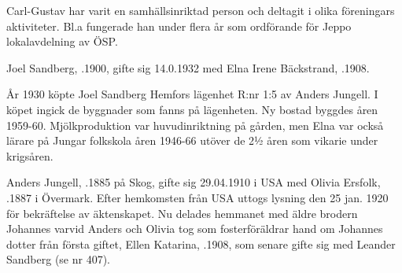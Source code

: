 Carl-Gustav har varit en samhällsinriktad person och deltagit i olika föreningars aktiviteter. Bl.a fungerade han under flera år som
ordförande för Jeppo lokalavdelning av ÖSP.
\begin{jhchildren}
  \item {}
  \item {}
  \item {}
  \item {}
\end{jhchildren}





Joel Sandberg, .1900, gifte sig 14.0.1932 med Elna Irene Bäckstrand, .1908.

År 1930 köpte Joel Sandberg Hemfors lägenhet R:nr 1:5 av Anders Jungell. I köpet ingick de byggnader som fanns på lägenheten. Ny bostad byggdes åren 1959-60. Mjölkproduktion var huvudinriktning på gården, men Elna var också lärare på Jungar folkskola åren 1946-66 utöver de 2½ åren som vikarie under krigsåren.
\begin{jhchildren}
  \item {}
  \item {}
  \item {}
  \item {}
\end{jhchildren}


Anders Jungell, .1885 på Skog, gifte sig  29.04.1910 i USA med Olivia Ersfolk, .1887 i Övermark. Efter hemkomsten från USA uttogs lysning den 25 jan. 1920 för bekräftelse av äktenskapet. Nu delades hemmanet med äldre brodern Johannes varvid Anders och Olivia tog som fosterföräldrar hand om Johannes dotter från första giftet, Ellen Katarina, .1908, som senare gifte sig med Leander Sandberg (se nr 407).

